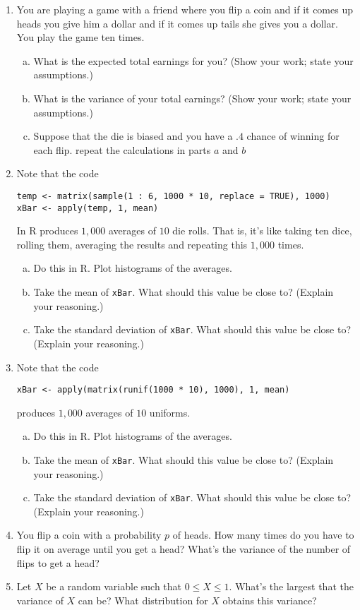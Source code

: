\documentclass[12pt]{article}
\begin{document}
\begin{enumerate}[1.]
\item You are playing a game with a friend where you flip a coin and if it comes up heads you
  give him a dollar and if it comes up tails she gives you a dollar. You play the game ten times.
  \begin{enumerate}[a.]
  \item What is the expected total earnings for you? (Show your work; state your assumptions.)
  \item What is the variance of your total earnings? (Show your work; state your assumptions.)
  \item Suppose that the die is biased and you have a $.4$ chance of winning for each flip.
    repeat the calculations in parts $a$ and $b$
  \end{enumerate}
 \item Note that the code 
\begin{verbatim}
temp <- matrix(sample(1 : 6, 1000 * 10, replace = TRUE), 1000)
xBar <- apply(temp, 1, mean)
\end{verbatim}
    In R produces $1,000$ averages of $10$ die rolls. That is, it's
    like taking ten dice, rolling them, averaging the results and
    repeating this $1,000$ times.
    \begin{enumerate}[a.]
    \item Do this in R. Plot histograms of the averages.
    \item Take the mean of \texttt{xBar}. What should this value be close to? (Explain your reasoning.)
    \item Take the standard deviation of \texttt{xBar}. What should this value be close to? (Explain your reasoning.)
    \end{enumerate}
  \item Note that the code
\begin{verbatim}
xBar <- apply(matrix(runif(1000 * 10), 1000), 1, mean)
\end{verbatim}
    produces $1,000$ averages of $10$ uniforms.
    \begin{enumerate}[a.]
    \item Do this in R. Plot histograms of the averages.
    \item Take the mean of \texttt{xBar}. What should this value be close to? (Explain your reasoning.)
    \item Take the standard deviation of \texttt{xBar}. What should this value be close to? (Explain your reasoning.)
    \end{enumerate}
\item You flip a coin with a probability $p$ of heads. How many times do you have to flip it on average
  until you get a head? What's the variance of the number of flips to get a head?
\item Let $X$ be a random variable such that $0 \leq X \leq 1$. What's the largest that the variance of
$X$ can be? What distribution for $X$ obtains this variance?
\end{enumerate}
\end{document}
